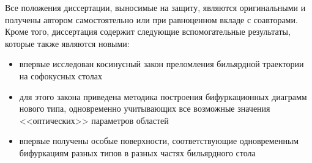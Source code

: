 %
%
%



{\novelty} 
Все положения диссертации, выносимые на защиту, являются оригинальными и получены автором самостоятельно  или при равноценном вкладе с соавторами. Кроме того, диссертация содержит следующие вспомогательные результаты, которые также являются новыми:
  \begin{itemize}[beginpenalty=10000] %
  \item впервые исследован косинусный закон преломления бильярдной траектории на софокусных столах
  \item для этого закона приведена методика построения бифуркационных диаграмм нового типа, одновременно учитывающих все возможные значения <<оптических>> параметров областей
  \item впервые получены особые поверхности, соответствующие одновременным бифуркациям разных типов в разных частях бильярдного стола
  \end{itemize}

